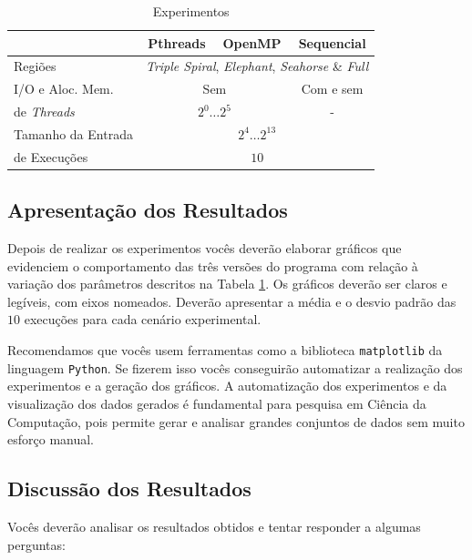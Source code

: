 \documentclass[final,12pt,a4paper]{elsarticle}
\begin{document}
\begin{table}[htpb]
    \centering
    \begin{tabular}{@{}lccc@{}}
        \toprule
        & Pthreads & OpenMP  & Sequencial \\ \midrule
        \addlinespace[0.8em]
        Regiões & \multicolumn{3}{c}{\textit{Triple Spiral}, \textit{Elephant}, \textit{Seahorse} \& \textit{Full}} \\
        \addlinespace[0.8em]
        I/O e Aloc. Mem. & \multicolumn{2}{c}{Sem} & Com e sem \\
        \addlinespace[0.8em]
        \textnumero{} de \textit{Threads} & \multicolumn{2}{c}{$2^0 \dots 2^5$} & -  \\
        \addlinespace[0.8em]
        Tamanho da Entrada & \multicolumn{3}{c}{$2^4 \dots 2^{13}$}\\
        \addlinespace[0.8em]
        \textnumero{} de Execuções & \multicolumn{3}{c}{$10$} \\ \midrule
        \end{tabular}
    \caption{Experimentos}
    \label{tab:exp}
\end{table}

\subsection{Apresentação dos Resultados}

Depois de realizar os experimentos vocês deverão elaborar gráficos que
evidenciem o comportamento das três versões do programa com relação à variação
dos parâmetros descritos na Tabela \ref{tab:exp}. Os gráficos deverão ser
claros e legíveis, com eixos nomeados. Deverão apresentar a média e o desvio
padrão das $10$ execuções para cada cenário experimental.

Recomendamos que vocês usem ferramentas como a biblioteca \texttt{matplotlib}
da linguagem \texttt{Python}. Se fizerem isso vocês conseguirão automatizar a
realização dos experimentos e a geração dos gráficos. A automatização dos
experimentos e da visualização dos dados gerados é fundamental para pesquisa em
Ciência da Computação, pois permite gerar e analisar grandes conjuntos de dados
sem muito esforço manual.

\subsection{Discussão dos Resultados}

Vocês deverão analisar os resultados obtidos e tentar responder a algumas
perguntas:
\end{document}
